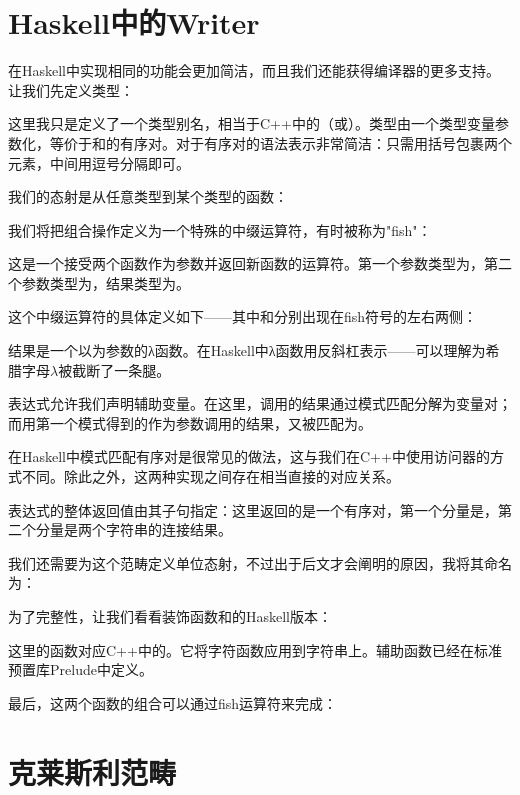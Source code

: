 \section{Haskell中的Writer}

在Haskell中实现相同的功能会更加简洁，而且我们还能获得编译器的更多支持。让我们先定义类型：

这里我只是定义了一个类型别名，相当于C++中的（或）。类型由一个类型变量参数化，等价于和的有序对。对于有序对的语法表示非常简洁：只需用括号包裹两个元素，中间用逗号分隔即可。

我们的态射是从任意类型到某个类型的函数：

我们将把组合操作定义为一个特殊的中缀运算符，有时被称为"fish"：

这是一个接受两个函数作为参数并返回新函数的运算符。第一个参数类型为，第二个参数类型为，结果类型为。

这个中缀运算符的具体定义如下——其中和分别出现在fish符号的左右两侧：

结果是一个以为参数的λ函数。在Haskell中λ函数用反斜杠表示——可以理解为希腊字母$\lambda$被截断了一条腿。

表达式允许我们声明辅助变量。在这里，调用的结果通过模式匹配分解为变量对；而用第一个模式得到的作为参数调用的结果，又被匹配为。

在Haskell中模式匹配有序对是很常见的做法，这与我们在C++中使用访问器的方式不同。除此之外，这两种实现之间存在相当直接的对应关系。

表达式的整体返回值由其子句指定：这里返回的是一个有序对，第一个分量是，第二个分量是两个字符串的连接结果。

我们还需要为这个范畴定义单位态射，不过出于后文才会阐明的原因，我将其命名为：

为了完整性，让我们看看装饰函数和的Haskell版本：

这里的函数对应C++中的。它将字符函数应用到字符串上。辅助函数已经在标准预置库Prelude中定义。

最后，这两个函数的组合可以通过fish运算符来完成：


\section{克莱斯利范畴}

